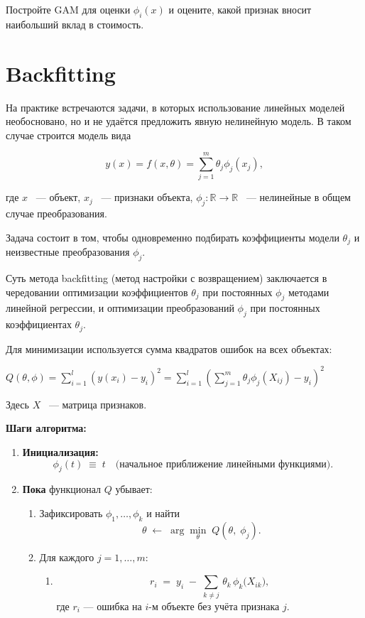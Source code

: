 {Постройте GAM для оценки $\phi_i(x)$ и оцените, какой признак вносит наибольший вклад в стоимость.





\section{Backfitting}

На практике встречаются задачи, в которых использование линейных моделей необосновано, но и не удаётся предложить явную нелинейную модель. В таком случае строится модель вида

$$\displaystyle y(x)=f(x,\theta)=\sum_{j=1}^m\theta_j \phi_j(x_j),$$

где $x$ ~--- объект, $x_j$ ~--- признаки объекта, $\phi_j:\mathbb{R}\rightarrow \mathbb{R}$ ~--- нелинейные в общем случае преобразования.

Задача состоит в том, чтобы одновременно подбирать коэффициенты модели $\theta_j$ и неизвестные преобразования $\phi_j$.

Суть метода backfitting (метод настройки с возвращением) заключается в чередовании оптимизации коэффициентов $\theta_j$ при постоянных $\phi_j$ методами линейной регрессии, и оптимизации преобразований $\phi_j$ при постоянных коэффициентах $\theta_j$.

Для минимизации используется сумма квадратов ошибок на всех объектах:

$Q(\theta, \phi) = \displaystyle \sum_{i=1}^l \left( y(x_i) - y_i \right)^2 = \sum_{i=1}^l \left( \sum_{j=1}^m \theta_j \phi_j(X_{ij}) - y_i \right)^2 $

Здесь $X$ ~--- матрица признаков.

\noindent
\textbf{Шаги алгоритма:}
\begin{enumerate}
    \item \textbf{Инициализация:}
          \[
              \phi_j(t) \;\equiv\; t
              \quad\text{(начальное приближение линейными функциями).}
          \]

    \item \textbf{Пока} функционал $Q$ убывает:
          \begin{enumerate}
              \item Зафиксировать $\phi_1,\dots,\phi_k$ и найти
                    \[
                        \theta \;\gets\; \arg\min_{\theta} \; Q(\theta,\;\phi_j).
                    \]
              \item Для каждого $j = 1,\dots,m$:
                    \begin{enumerate}
                        \item
                              \[
                                  r_i \;=\; y_i \;-\; \sum_{k\neq j}\,\theta_k\,\phi_k\bigl(X_{ik}\bigr),
                              \]
                              где $r_i$ — ошибка на $i$-м объекте без учёта признака $j$.


\end{enumerate}
\end{enumerate}
\end{enumerate}}
